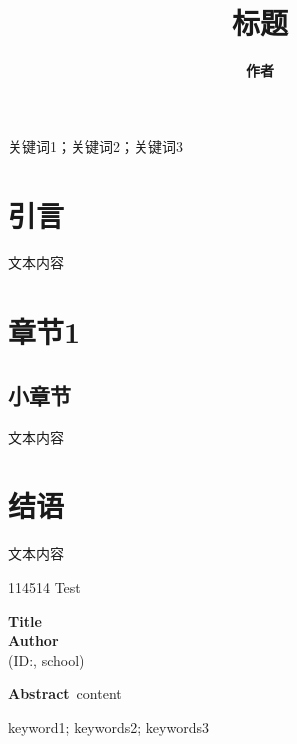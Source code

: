 \documentclass[a4paper]{ctexart}
\title{\textbf{标题}}
\author{\textbf{作者}}
\affil{（学号：xxx，班级，单位）}
\date{}
\begin{document}
\maketitle
\thispagestyle{empty}
\begin{abstract}
\normalsize{}
\end{abstract}
\begin{description}
\setlength{\leftskip}{2em}
\item[关键词] 关键词1；关键词2；关键词3
\end{description}
\section{引言}
\par 文本内容
\section{章节1}
\subsection{小章节}
\par 文本内容\cite{1}
\section{结语}
\par 文本内容
\begin{thebibliography}{114514}
Test
\end{thebibliography}
\begin{center}
    \LARGE
    \textbf{Title}
    \\[10pt]
    \large
    \textbf{Author}
    \\[8pt]
    \large
    (ID:, school)
\end{center}
\noindent\textbf{Abstract}\ content
\begin{description}
\setlength{\leftskip}{2em}
\item[Keywords] keyword1; keywords2; keywords3
\end{description}
\end{document}
